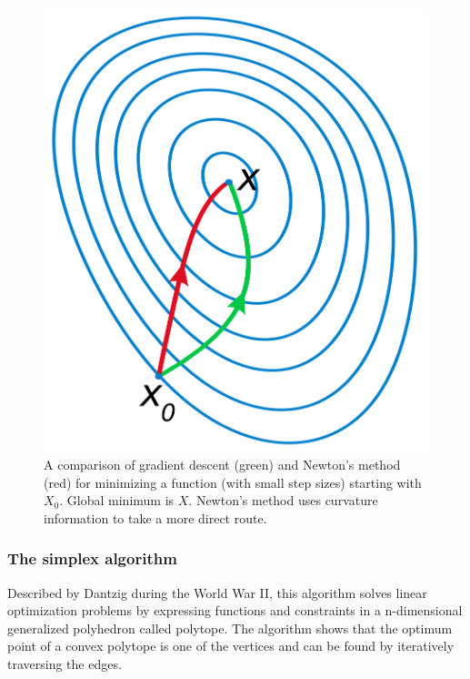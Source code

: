 \begin{figure}[H]
	\includegraphics[width=\textwidth]{./figures/04/gradientdescent.png}
	\caption[Gradient descent vs Newton's optimization]{A comparison of gradient descent (green) and Newton's method (red) for minimizing a function (with small step sizes) starting with $ X_{0} $. Global minimum is $ X $. Newton's method uses curvature information to take a more direct route.}
	\label{fig:gradientdescent}
\end{figure}

\subsubsection{The simplex algorithm}
Described by Dantzig during the World War II, this algorithm solves linear optimization problems by expressing functions and constraints in a n-dimensional generalized polyhedron called polytope. The algorithm shows that the optimum point of a convex polytope is one of the vertices and can be found by iteratively traversing the edges.

